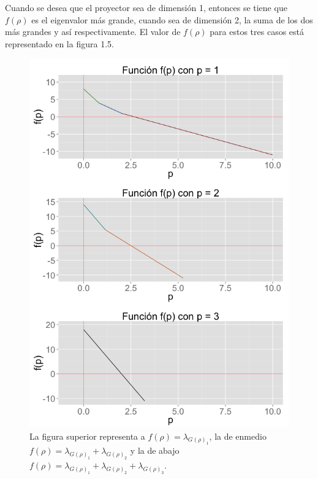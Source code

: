 \begin{example}
Cuando se desea que el proyector sea de dimensión 1, entonces se tiene que $f(\rho)$ es el eigenvalor más grande,  cuando sea de dimensión 2, la suma de los dos más grandes y así respectivamente. El valor de $f(\rho)$ para estos tres casos está representado en la figura 1.5.

\begin{figure}[!ht] \label{Fig1.5}
  \centering
  \includegraphics[width=1\textwidth]{Figures/Chapter2_grid3eigen}  
  \caption[$f(\rho)$ para proyectores de 1,2 y 3 dimensiones.] {La figura superior representa a $f(\rho) = \lambda_{G(\rho)_1}$, la de enmedio $f(\rho) = \lambda_{G(\rho)_1} + \lambda_{G(\rho)_2}$ y la de abajo $f(\rho) = \lambda_{G(\rho)_1} + \lambda_{G(\rho)_2} + \lambda_{G(\rho)_3}$.}
\end{figure}

\end{example}
\pagebreak

